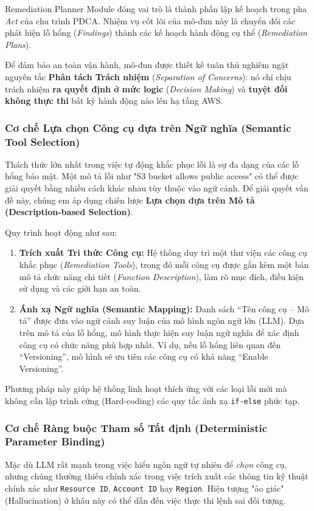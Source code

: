 Remediation Planner Module
đóng vai trò là thành phần lập kế hoạch
trong pha \textit{Act} của chu trình PDCA.
Nhiệm vụ cốt lõi của mô-đun này
là chuyển đổi các phát hiện lỗ hổng
(\textit{Findings})
thành các kế hoạch hành động cụ thể
(\textit{Remediation Plans}).

Để đảm bảo an toàn vận hành,
mô-đun được thiết kế
tuân thủ nghiêm ngặt
nguyên tắc
\textbf{Phân tách Trách nhiệm}
(\textit{Separation of Concerns}):
nó chỉ chịu trách nhiệm
\textbf{ra quyết định ở mức logic}
(\textit{Decision Making})
và \textbf{tuyệt đối không thực thi}
bất kỳ hành động nào
lên hạ tầng AWS.

\subsubsection*{Cơ chế Lựa chọn Công cụ dựa trên Ngữ nghĩa (Semantic Tool Selection)}
Thách thức lớn nhất trong việc tự động khắc phục lỗi là sự đa dạng của các lỗ hổng bảo mật. Một mô tả lỗi như "S3 bucket allows public access" có thể được giải quyết bằng nhiều cách khác nhau tùy thuộc vào ngữ cảnh. Để giải quyết vấn đề này, chúng em áp dụng chiến lược \textbf{Lựa chọn dựa trên Mô tả (Description-based Selection)}.

Quy trình hoạt động như sau:
\begin{enumerate}
  \item \textbf{Trích xuất Tri thức Công cụ:}
    Hệ thống duy trì
    một thư viện các công cụ khắc phục
    (\textit{Remediation Tools}),
    trong đó mỗi công cụ
    được gắn kèm
    một bản mô tả chức năng chi tiết
    (\textit{Function Description}),
    làm rõ mục đích,
    điều kiện sử dụng
    và các giới hạn an toàn.

  \item \textbf{Ánh xạ Ngữ nghĩa (Semantic Mapping):}
    Danh sách
    ``Tên công cụ – Mô tả''
    được đưa vào ngữ cảnh suy luận
    của mô hình ngôn ngữ lớn (LLM).
    Dựa trên mô tả của lỗ hổng,
    mô hình thực hiện suy luận ngữ nghĩa
    để xác định công cụ
    có chức năng phù hợp nhất.
    Ví dụ,
    nếu lỗ hổng liên quan đến
    ``Versioning'',
    mô hình sẽ ưu tiên
    các công cụ
    có khả năng
    ``Enable Versioning''.
\end{enumerate}

Phương pháp này giúp hệ thống linh hoạt thích ứng với các loại lỗi mới mà không cần lập trình cứng (Hard-coding) các quy tắc ánh xạ \texttt{if-else} phức tạp.

\subsubsection*{Cơ chế Ràng buộc Tham số Tất định (Deterministic Parameter Binding)}
Mặc dù LLM rất mạnh trong việc hiểu ngôn ngữ tự nhiên để \textit{chọn} công cụ, nhưng chúng thường thiếu chính xác trong việc trích xuất các thông tin kỹ thuật chính xác như \texttt{Resource ID}, \texttt{Account ID} hay \texttt{Region}. Hiện tượng "ảo giác" (Hallucination) ở khâu này có thể dẫn đến việc thực thi lệnh sai đối tượng.


